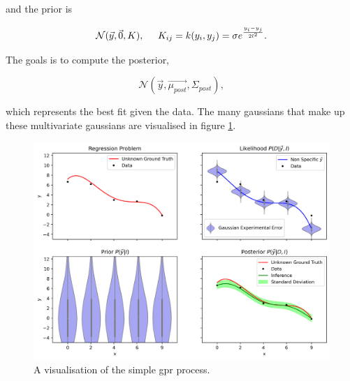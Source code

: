 and the prior is

\begin{equation}
  \mathcal{N}(\vec{y}, \vec{0}, K),\hspace{0.5cm} K_{ij} = k(y_i, y_j) = \sigma e^{\frac{y_i - y_j}{2l^2}}.
  \label{eq:prior}
\end{equation}

The goals is to compute the posterior,

\begin{equation}
  \mathcal{N}(\vec{y}, \vec{\mu_{post}}, \Sigma_{post}),
  \label{eq:posterior}
\end{equation}

which represents the best fit given the data. The many gaussians that make up these multivariate gaussians are visualised in figure \ref{fig:gprvis}. 

\begin{figure}[H]
  \centering
  \includegraphics[width=17cm]{images/gprvis.png}
  \caption{A visualisation of the simple \gls{gpr} process.}
  \label{fig:gprvis}
\end{figure}


